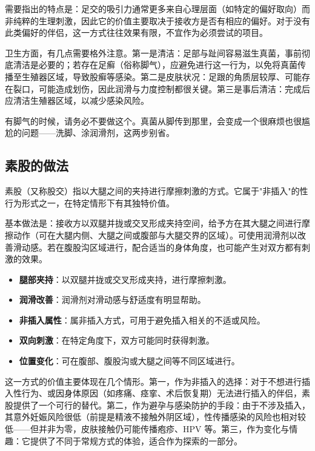 \documentclass[12pt,UTF8]{ctexbook}
\newcommand{\keyword}[1]{\textbf{#1}}
\begin{document}
需要指出的特点是：足交的吸引力通常更多来自心理层面（如特定的偏好取向）而非纯粹的生理刺激，因此它的价值主要取决于接收方是否有相应的偏好。对于没有此类偏好的伴侣，这一方式往往效果有限，不宜作为必须尝试的项目。

卫生方面，有几点需要格外注意。第一是清洁：足部与趾间容易滋生真菌，事前彻底清洁是必要的；若存在足癣（俗称脚气），应避免进行这一行为，以免将真菌传播至生殖器区域，导致股癣等感染。第二是皮肤状况：足跟的角质层较厚、可能存在裂口，可能造成划伤，因此润滑与力度控制都很关键。第三是事后清洁：完成后应清洁生殖器区域，以减少感染风险。

\begin{tcolorbox}[colback=pink!5!white,colframe=red!50!black,title=贴心小叮咛]
	有脚气的时候，请务必不要做这个。真菌从脚传到那里，会变成一个很麻烦也很尴尬的问题——洗脚、涂润滑剂，这两步别省。
\end{tcolorbox}
\subsection{素股的做法}

素股（又称股交）指以大腿之间的夹持进行摩擦刺激的方式。它属于"非插入"的性行为形式之一，在特定情形下有其独特价值。

基本做法是：接收方以双腿并拢或交叉形成夹持空间，给予方在其大腿之间进行摩擦动作（可在大腿内侧、大腿之间或腹部与大腿交界的区域）。可使用润滑剂以改善滑动感。若在腹股沟区域进行，配合适当的身体角度，也可能产生对双方都有刺激的效果。

\begin{itemize}
	\item \keyword{腿部夹持}：以双腿并拢或交叉形成夹持，进行摩擦刺激。
	\item \keyword{润滑改善}：润滑剂对滑动感与舒适度有明显帮助。
	\item \keyword{非插入属性}：属非插入方式，可用于避免插入相关的不适或风险。
	\item \keyword{双向刺激}：在特定角度下，双方可能同时获得刺激。
	\item \keyword{位置变化}：可在腹部、腹股沟或大腿之间等不同区域进行。
\end{itemize}

这一方式的价值主要体现在几个情形。第一，作为非插入的选择：对于不想进行插入性行为、或因身体原因（如疼痛、痉挛、术后恢复期）无法进行插入的伴侣，素股提供了一个可行的替代。第二，作为避孕与感染防护的手段：由于不涉及插入，其意外妊娠风险很低（前提是精液不接触外阴区域），性传播感染的风险也相对较低——但并非为零，皮肤接触仍可能传播疱疹、HPV 等。第三，作为变化与情趣：它提供了不同于常规方式的体验，适合作为探索的一部分。
\end{document}
